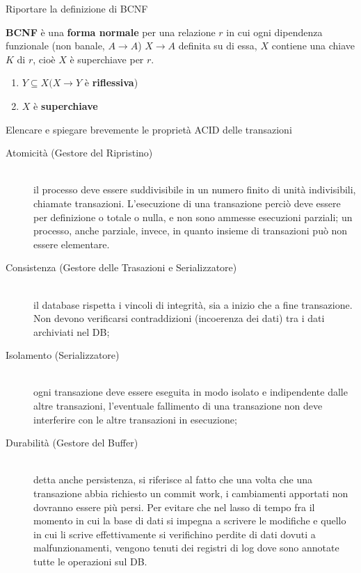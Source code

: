 \documentclass{exam}
\begin{document}
\begin{questions}
    \question Riportare la definizione di BCNF
    \begin{solution}
        \textbf{BCNF} è una \textbf{forma normale} per una relazione $r$ in cui ogni dipendenza funzionale (non banale, $A \rightarrow A$)
        $X \rightarrow A$ definita su di essa, $X$ contiene una chiave $K$ di $r$, cioè $X$ è superchiave per $r$.
        \begin{enumerate}
            \item $Y \subseteq X (X \rightarrow Y$ è \textbf{riflessiva})
            \item $X$ è \textbf{superchiave}
        \end{enumerate}
    \end{solution}
    \question Elencare e spiegare brevemente le proprietà ACID delle transazioni
    \begin{solution}
        \begin{description}
            \item[Atomicità (Gestore del Ripristino)] \hfill \\ il processo deve essere suddivisibile in un numero finito di unità indivisibili, chiamate transazioni. L'esecuzione di una transazione perciò deve essere per definizione o totale o nulla, e non sono ammesse esecuzioni parziali; un processo, anche parziale, invece, in quanto insieme di transazioni può non essere elementare.
            \item[Consistenza (Gestore delle Trasazioni e Serializzatore)] \hfill \\ il database rispetta i vincoli di integrità, sia a inizio che a fine transazione. Non devono verificarsi contraddizioni (incoerenza dei dati) tra i dati archiviati nel DB;
            \item[Isolamento (Serializzatore)] \hfill \\ ogni transazione deve essere eseguita in modo isolato e indipendente dalle altre transazioni, l'eventuale fallimento di una transazione non deve interferire con le altre transazioni in esecuzione;
            \item[Durabilità (Gestore del Buffer)] \hfill \\ detta anche persistenza, si riferisce al fatto che una volta che una transazione abbia richiesto un commit work, i cambiamenti apportati non dovranno essere più persi. Per evitare che nel lasso di tempo fra il momento in cui la base di dati si impegna a scrivere le modifiche e quello in cui li scrive effettivamente si verifichino perdite di dati dovuti a malfunzionamenti, vengono tenuti dei registri di log dove sono annotate tutte le operazioni sul DB.

\end{description}
\end{solution}
\end{questions}
\end{document}

